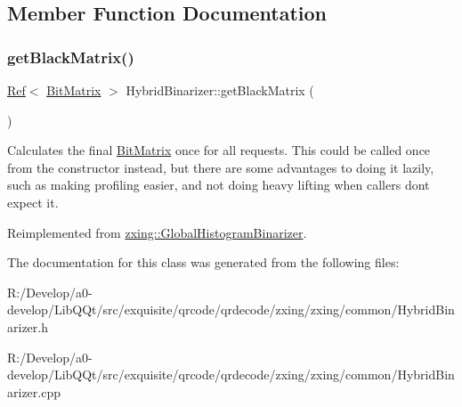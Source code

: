 \subsection{Member Function Documentation}
\mbox{\label{classzxing_1_1_hybrid_binarizer_a14a970ec0197b7188f64e352e9ea1e33}} 
\subsubsection{\texorpdfstring{get\+Black\+Matrix()}{getBlackMatrix()}}
{\footnotesize\ttfamily \mbox{\hyperlink{classzxing_1_1_ref}{Ref}}$<$ \mbox{\hyperlink{classzxing_1_1_bit_matrix}{Bit\+Matrix}} $>$ Hybrid\+Binarizer\+::get\+Black\+Matrix (\begin{DoxyParamCaption}{ }\end{DoxyParamCaption})\hspace{0.3cm}{\ttfamily [virtual]}}

Calculates the final \mbox{\hyperlink{classzxing_1_1_bit_matrix}{Bit\+Matrix}} once for all requests. This could be called once from the constructor instead, but there are some advantages to doing it lazily, such as making profiling easier, and not doing heavy lifting when callers don\textquotesingle{}t expect it. 

Reimplemented from \mbox{\hyperlink{classzxing_1_1_global_histogram_binarizer}{zxing\+::\+Global\+Histogram\+Binarizer}}.



The documentation for this class was generated from the following files\+:\begin{DoxyCompactItemize}
\item 
R\+:/\+Develop/a0-\/develop/\+Lib\+Q\+Qt/src/exquisite/qrcode/qrdecode/zxing/zxing/common/Hybrid\+Binarizer.\+h\item 
R\+:/\+Develop/a0-\/develop/\+Lib\+Q\+Qt/src/exquisite/qrcode/qrdecode/zxing/zxing/common/Hybrid\+Binarizer.\+cpp\end{DoxyCompactItemize}
